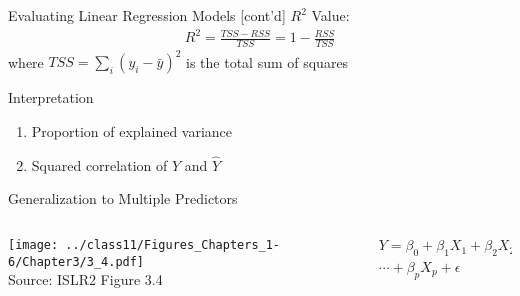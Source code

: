 \documentclass[ignorenonframetext,xcolor=x11names]{beamer}
\begin{document}
\begin{frame}{Evaluating Linear Regression Models \small [cont'd]}
$R^2$ Value:
\begin{align*}
R^2 = \frac{TSS - RSS}{TSS} = 1 - \frac{RSS}{TSS}
\end{align*}
where $TSS = \sum_i(y_i - \bar{y})^2$ is the total sum of squares
\begin{block}{Interpretation}
\begin{enumerate}
  \item Proportion of explained variance
  \item Squared correlation of $Y$ and $\hat{Y}$
\end{enumerate}
\end{block}

\end{frame}

\begin{frame}{Generalization to Multiple Predictors}
\begin{columns}
\begin{column}{0.65\textwidth}
\texttt{[image: ../class11/Figures\_Chapters\_1-6/Chapter3/3\_4.pdf]}  \\
\scriptsize Source: ISLR2 Figure 3.4
\end{column}
\begin{column}{0.35\textwidth}
\begin{multline*}
Y = \beta_0 + \beta_1 X_1 + \beta_2 X_2 + \\
\cdots + \beta_p X_p + \epsilon
\end{multline*}
\end{column}
\end{columns}
\end{frame}
\end{document}

